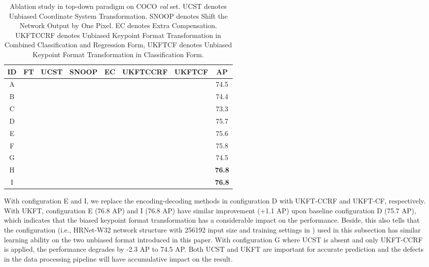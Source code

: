 \documentclass[10pt,journal,compsoc]{IEEEtran}
\begin{document}
\begin{table}[t]
\footnotesize
\caption{Ablation study in top-down paradigm on COCO \textit{val} set. UCST denotes Unbiased Coordinate System Transformation. SNOOP denotes Shift the Network Output by One Pixel. EC denotes Extra Compensation. UKFTCCRF denotes Unbiased Keypoint Format Transformation in Combined Classification and Regression Form, UKFTCF denotes Unbiased Keypoint Format Transformation in Classification Form.}
\begin{center}
\begin{tabular}{c|c|c|c|c|c|c|c}

\hline
ID      &FT             &UCST           &SNOOP          &EC             &UKFTCCRF       &UKFTCF        &AP   \\
\hline
A       &               &               &               &               &               &               &74.5 \\
B       &               &   &               &               &               &               &74.4 \\
C       &   &               &               &               &               &               &73.3 \\
D       &   &   &               &               &               &               &75.7 \\
E       &   &               &   &               &               &               &75.6 \\
F       &   &               &   &   &               &               &75.8 \\
\hline
G       &   &               &               &               &   &               &74.5 \\
H       &   &   &               &               &   &               &\textbf{76.8} \\
I       &   &   &               &               &               &   &\textbf{76.8} \\
\hline
\end{tabular}
\end{center}
\label{tab:ablation_top_down}
\end{table}


With configuration E and I, we replace the encoding-decoding methods in configuration D with UKFT-CCRF and UKFT-CF, respectively. With UKFT, configuration E (76.8 AP) and I (76.8 AP) have similar improvement (+1.1 AP) upon baseline configuration D (75.7 AP), which indicates that the biased keypoint format transformation has a considerable impact on the performance. Beside, this also tells that the configuration (i.e., HRNet-W32 network structure with 256192 input size and training settings in \cite{HRNet}) used in this subsection has similar learning ability on the two unbiased format introduced in this paper. With configuration G where UCST is absent and only UKFT-CCRF is applied, the performance degrades by -2.3 AP to 74.5 AP. Both UCST and UKFT are important for accurate prediction and the defects in the data processing pipeline will have accumulative impact on the result.
\end{document}
